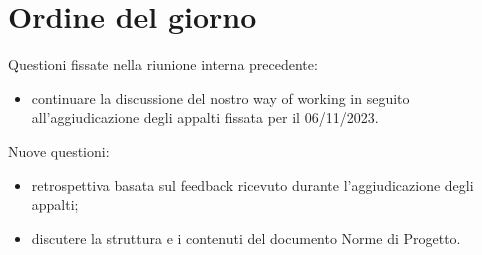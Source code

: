 \documentclass[12pt]{article}
\begin{document}
    \section{Ordine del giorno}
        Questioni fissate nella riunione interna precedente:
    	\begin{itemize}
    		\item continuare la discussione del nostro way of working in seguito all'aggiudicazione degli appalti fissata per il 06/11/2023.
    	\end{itemize}
    	Nuove questioni:
    	\begin{itemize}
			\item retrospettiva basata sul feedback ricevuto durante l'aggiudicazione degli appalti;
    		\item discutere la struttura e i contenuti del documento Norme di Progetto.
    	\end{itemize}
    
\end{document}
